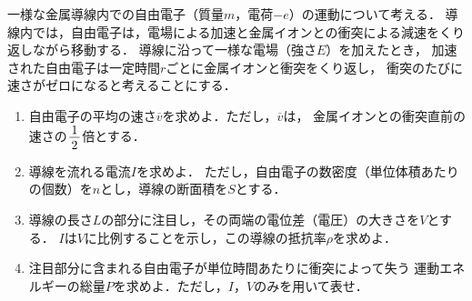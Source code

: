 \documentclass[../../../uem_phy_std_q.tex]{subfiles}
\begin{document}
    一様な金属導線内での自由電子（質量$m$，電荷$-e$）の運動について考える．%
    導線内では，自由電子は，電場による加速と金属イオンとの衝突による減速をくり返しながら移動する．%
    導線に沿って一様な電場（強さ$E$）を加えたとき，%
    加速された自由電子は一定時間$r$ごとに金属イオンと衝突をくり返し，%
    衝突のたびに速さがゼロになると考えることにする．

    \begin{enumerate}
        \item 自由電子の平均の速さ$\overline{v}$を求めよ．ただし，$\overline{v}$は，%
            金属イオンとの衝突直前の速さの$\myfraca{1}{2}$倍とする．
        \item 導線を流れる電流$I$を求めよ．%
            ただし，自由電子の数密度（単位体積あたりの個数）を$n$とし，導線の断面積を$S$とする．
        \item 導線の長さ$L$の部分に注目し，その両端の電位差（電圧）の大きさを$V$とする．%
            $I$は$V$に比例することを示し，この導線の抵抗率$\rho$を求めよ．
        \item 注目部分に含まれる自由電子が単位時間あたりに衝突によって失う%
            運動エネルギーの総量$P$を求めよ．ただし，$I$，$V$のみを用いて表せ．
    \end{enumerate}
\end{document}
